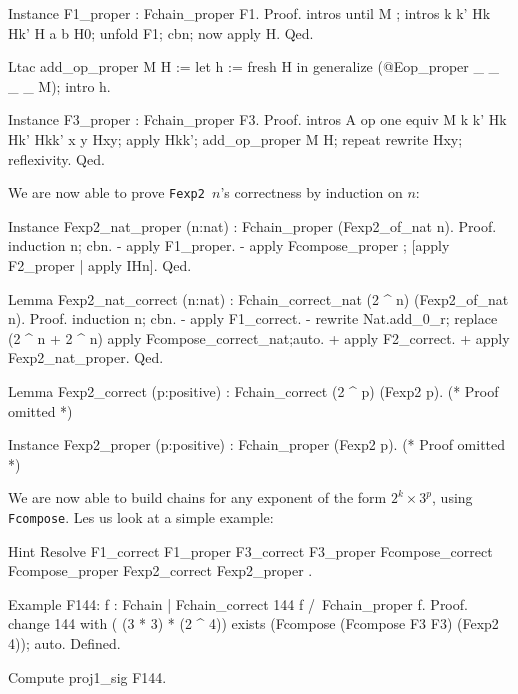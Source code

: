 \begin{Coqsrc}
Instance F1_proper : Fchain_proper F1.
Proof.
  intros until M ; intros k k' Hk Hk' H a b H0; unfold F1; cbn;
  now apply H.  
Qed.
\end{Coqsrc}

\begin{Coqsrc}
Ltac add_op_proper M H := 
 let h := fresh H in
   generalize (@Eop_proper _ _ _ _ M); intro h.


Instance F3_proper : Fchain_proper F3.
Proof.
  intros  A op one equiv M  k k' Hk Hk'  Hkk' x y Hxy;  
  apply Hkk'; add_op_proper M H; repeat rewrite Hxy;
  reflexivity.
Qed.
\end{Coqsrc}


We are now able to prove  \texttt{Fexp2 $n$}'s correctness by induction 
on $n$:

\begin{Coqsrc}
Instance Fexp2_nat_proper (n:nat) : 
                           Fchain_proper (Fexp2_of_nat n).
Proof.
 induction n; cbn.
   - apply F1_proper.
   - apply Fcompose_proper ; [apply F2_proper | apply IHn].
Qed.
\end{Coqsrc}

\begin{Coqsrc}
Lemma  Fexp2_nat_correct (n:nat) : 
         Fchain_correct_nat (2  ^ n) (Fexp2_of_nat n).
Proof.
  induction n; cbn.
 - apply F1_correct.
 -  rewrite Nat.add_0_r;
   replace (2 ^ n + 2 ^ n)%
   apply Fcompose_correct_nat;auto.
   +  apply F2_correct.
   +  apply  Fexp2_nat_proper.
Qed.
\end{Coqsrc}

\begin{Coqsrc}
Lemma  Fexp2_correct (p:positive) : 
                           Fchain_correct (2  ^ p) (Fexp2 p).
(* Proof omitted *)

Instance  Fexp2_proper (p:positive) : Fchain_proper (Fexp2 p).
(* Proof omitted *)

\end{Coqsrc}

We are now  able to build chains for any exponent of the form 
$2^k\times 3^p$, using \texttt{Fcompose}. Les us look at a simple example:

\begin{Coqsrc}
Hint Resolve F1_correct F1_proper
     F3_correct F3_proper Fcompose_correct Fcompose_proper
     Fexp2_correct Fexp2_proper .

Example F144:  {f : Fchain | Fchain_correct 144 f /\
                                Fchain_proper f}.
Proof.
 change 144 with ( (3 * 3) * (2 ^ 4))%
 exists (Fcompose (Fcompose F3 F3) (Fexp2 4)); auto.
Defined.


Compute proj1_sig F144.
\end{Coqsrc}

